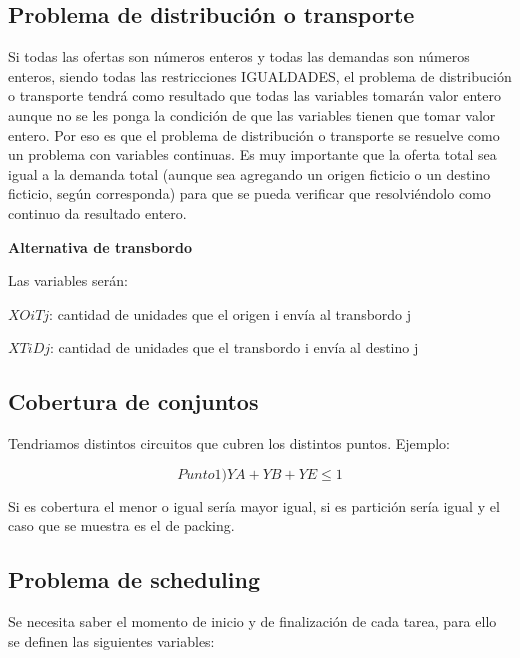 \documentclass[titlepage,a4paper]{article}
\begin{document}
\vspace{0.5cm}

\subsection{Problema de distribución o transporte}

Si todas las ofertas son números enteros y todas las demandas son números enteros, siendo todas las restricciones IGUALDADES, el problema de distribución o transporte tendrá como resultado que todas las variables tomarán valor entero aunque no se les ponga la condición de que las variables tienen que
tomar valor entero.
Por eso es que el problema de distribución o transporte se resuelve como un problema con variables continuas. Es muy importante que la oferta total sea igual a la demanda total (aunque sea agregando un origen ficticio o un
destino ficticio, según corresponda) para que se pueda verificar que resolviéndolo como continuo da resultado entero.

\vspace{0.25cm}

\textbf{Alternativa de transbordo}

Las variables serán:

$XOiTj$: cantidad de unidades que el origen i envía al transbordo j

$XTiDj$: cantidad de unidades que el transbordo i envía al destino j

\vspace{0.5cm}

\subsection{Cobertura de conjuntos}

Tendriamos distintos circuitos que cubren los distintos puntos. Ejemplo:

$$ Punto1) YA + YB + YE  \leq 1 $$

Si es cobertura el menor o igual sería mayor igual, si es partición sería igual y el caso que se muestra es el de packing.

\vspace{0.5cm}

\subsection{Problema de scheduling}

Se necesita saber el momento de inicio y de finalización de cada tarea, para ello se definen las siguientes variables:
\end{document}
